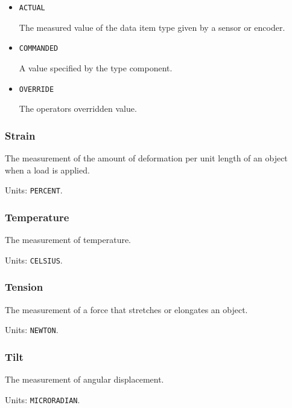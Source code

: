 \begin{itemize}

\item \texttt{ACTUAL}


The measured value of the data item type given by a sensor or encoder.

\item \texttt{COMMANDED}


A value specified by the  type component.

\item \texttt{OVERRIDE}


The operators overridden value.


\end{itemize}

\subsubsection{Strain}
\label{sec:Strain}



The measurement of the amount of deformation per unit length of an object when a load is applied.


Units: \texttt{PERCENT}.

\subsubsection{Temperature}
\label{sec:Temperature}



The measurement of temperature.


Units: \texttt{CELSIUS}.

\subsubsection{Tension}
\label{sec:Tension}



The measurement of a force that stretches or elongates an object.


Units: \texttt{NEWTON}.

\subsubsection{Tilt}
\label{sec:Tilt}



The measurement of angular displacement.


Units: \texttt{MICRO\textunderscore RADIAN}.

